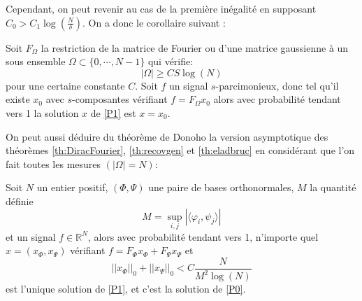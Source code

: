 Cependant, on peut revenir au cas de la première inégalité en supposant $C_0> C_1\log(\frac{N}{\delta})$. 
\newline
On a donc le corollaire suivant :
\begin{theoreme}
	Soit $F_{\Omega}$ la restriction de la matrice de Fourier ou d'une matrice gaussienne à un sous ensemble $\Omega \subset \{0, \cdots, N-1\}$ qui vérifie:
	\begin{equation}
		|\Omega| \geq C S \log(N)
	\end{equation}
	pour une certaine constante $C$.
	Soit $f$ un signal $s$-parcimonieux, donc tel qu'il existe $x_0$ avec $s$-composantes vérifiant $f=F_{\Omega}x_0$ alors avec probabilité tendant vers 1 la solution $x$ de \ref{P1} est $x=x_0$.
\end{theoreme}
On peut aussi déduire du théorème de Donoho la version asymptotique des théorèmes \ref{th:DiracFourier}, \ref{th:recovgen} et \ref{th:eladbruc} en considérant que l'on fait toutes les mesures $(|\Omega| =N)$:
\begin{theoreme}\label{th:recovgen}
		Soit $N$ un entier positif, $(\Phi, \Psi)$ une paire de bases orthonormales, $M$ la quantité définie 
		\begin{equation}
			M = \sup_{i,j} |\langle \varphi_i, \psi_j \rangle|
		\end{equation}
		et un signal $f\in \mathbb{R}^N$, alors avec probabilité tendant vers 1, n'importe quel $x = (x_\Phi, x_\Psi)$ vérifiant $f = F_\Phi x_\Phi + F_\Psi x_\Psi$ et
	\begin{equation}\label{eq:cond1}
		||x_\Phi||_0 +  ||x_\Psi||_0 < C \frac{N}{M^2\log(N)}
	\end{equation}
	est l'unique solution de \ref{P1}, et c'est la solution de \ref{P0}.
\end{theoreme}




